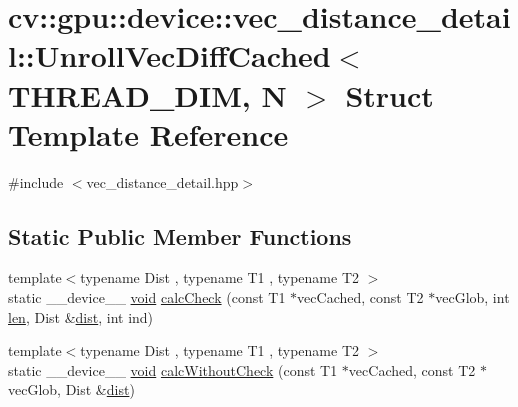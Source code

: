 \hypertarget{structcv_1_1gpu_1_1device_1_1vec__distance__detail_1_1UnrollVecDiffCached}{\section{cv\-:\-:gpu\-:\-:device\-:\-:vec\-\_\-distance\-\_\-detail\-:\-:Unroll\-Vec\-Diff\-Cached$<$ T\-H\-R\-E\-A\-D\-\_\-\-D\-I\-M, N $>$ Struct Template Reference}
\label{structcv_1_1gpu_1_1device_1_1vec__distance__detail_1_1UnrollVecDiffCached}
}


{\ttfamily \#include $<$vec\-\_\-distance\-\_\-detail.\-hpp$>$}

\subsection*{Static Public Member Functions}
\begin{DoxyCompactItemize}
\item 
{\footnotesize template$<$typename Dist , typename T1 , typename T2 $>$ }\\static \-\_\-\-\_\-device\-\_\-\-\_\- \hyperlink{legacy_8hpp_a8bb47f092d473522721002c86c13b94e}{void} \hyperlink{structcv_1_1gpu_1_1device_1_1vec__distance__detail_1_1UnrollVecDiffCached_aa7fa781f984f64763bdf91a175bff2a4}{calc\-Check} (const T1 $\ast$vec\-Cached, const T2 $\ast$vec\-Glob, int \hyperlink{core__c_8h_accb79be93f4fbcaa15b5a7670569c9f8}{len}, Dist \&\hyperlink{legacy_8hpp_ae895c2003a87eda49126845b7ac3688e}{dist}, int ind)
\item 
{\footnotesize template$<$typename Dist , typename T1 , typename T2 $>$ }\\static \-\_\-\-\_\-device\-\_\-\-\_\- \hyperlink{legacy_8hpp_a8bb47f092d473522721002c86c13b94e}{void} \hyperlink{structcv_1_1gpu_1_1device_1_1vec__distance__detail_1_1UnrollVecDiffCached_a2c1282cf9271d23832f52aa00157f177}{calc\-Without\-Check} (const T1 $\ast$vec\-Cached, const T2 $\ast$vec\-Glob, Dist \&\hyperlink{legacy_8hpp_ae895c2003a87eda49126845b7ac3688e}{dist})
\end{DoxyCompactItemize}


